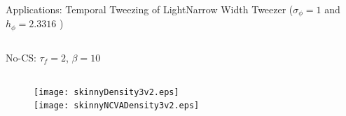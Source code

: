 \begin{frame}[c]{Applications: Temporal Tweezing of Light}{\textcolor{paleblue}{Narrow Width Tweezer} ($\sigma_\phi = 1$ and $h_\phi  = 2.3316$ )}
\begin{columns}
\begin{column}{0.75\textwidth}
\vspace{0.5em}
{\small No-CS:  $\tau_f =2$, $\beta = 10$ }
\begin{columns}
\begin{column}{0.5\textwidth}
\centering
\vspace{-1em}
\begin{figure}
\hspace{2em}\texttt{[image: skinnyDensity3v2.eps]}  \\
\vspace{-0.5em}
\hspace{2em}\texttt{[image: skinnyNCVADensity3v2.eps]} 
\end{figure}
\end{column}
\begin{column}{0.5\textwidth}
\vspace{-0.5em} \raggedright
\hspace{-2em}%
\end{column}
\end{columns}
\end{column}
\end{columns}
\end{frame}






%
%
